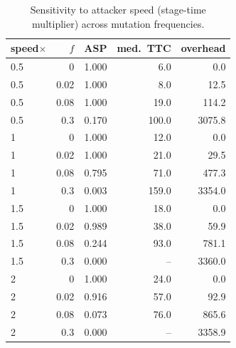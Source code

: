 \begin{table}[t]
\centering
\caption{Sensitivity to attacker speed (stage-time multiplier) across mutation frequencies.}
\label{tab:sensitivity_speed}
\begin{tabular}{lrrrr}
\toprule
speed$\times$ & $f$ & ASP & med.\ TTC & overhead \\
\midrule
0.5 & 0 & 1.000 & 6.0 & 0.0 \\
0.5 & 0.02 & 1.000 & 8.0 & 12.5 \\
0.5 & 0.08 & 1.000 & 19.0 & 114.2 \\
0.5 & 0.3 & 0.170 & 100.0 & 3075.8 \\
1 & 0 & 1.000 & 12.0 & 0.0 \\
1 & 0.02 & 1.000 & 21.0 & 29.5 \\
1 & 0.08 & 0.795 & 71.0 & 477.3 \\
1 & 0.3 & 0.003 & 159.0 & 3354.0 \\
1.5 & 0 & 1.000 & 18.0 & 0.0 \\
1.5 & 0.02 & 0.989 & 38.0 & 59.9 \\
1.5 & 0.08 & 0.244 & 93.0 & 781.1 \\
1.5 & 0.3 & 0.000 & -- & 3360.0 \\
2 & 0 & 1.000 & 24.0 & 0.0 \\
2 & 0.02 & 0.916 & 57.0 & 92.9 \\
2 & 0.08 & 0.073 & 76.0 & 865.6 \\
2 & 0.3 & 0.000 & -- & 3358.9 \\
\bottomrule
\end{tabular}
\end{table}
